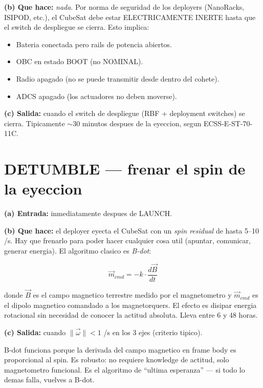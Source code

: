 \documentclass[11pt,a4paper,oneside,openright]{book}
\begin{document}
\textbf{(b) Que hace:} \emph{nada}. Por norma de seguridad de los
deployers (NanoRacks, ISIPOD, etc.), el CubeSat debe estar
ELECTRICAMENTE INERTE hasta que el switch de despliegue se cierra.
Esto implica:

\begin{itemize}[leftmargin=2em]
  \item Bateria conectada pero rails de potencia abiertos.
  \item OBC en estado BOOT (no NOMINAL).
  \item Radio apagado (no se puede transmitir desde dentro del cohete).
  \item ADCS apagado (los actuadores no deben moverse).
\end{itemize}

\textbf{(c) Salida:} cuando el switch de despliegue (RBF + deployment
switches) se cierra. Tipicamente $\sim$30 minutos despues de la
eyeccion, segun ECSS-E-ST-70-11C.

\section{DETUMBLE --- frenar el spin de la eyeccion}

\textbf{(a) Entrada:} inmediatamente despues de LAUNCH.

\textbf{(b) Que hace:} el deployer eyecta el CubeSat con un
\emph{spin residual} de hasta 5--10 \textdegree/s. Hay que frenarlo
para poder hacer cualquier cosa util (apuntar, comunicar, generar
energia). El algoritmo clasico es \emph{B-dot}:

\begin{equation}
\vec{m}_{cmd} = -k \cdot \frac{d\vec{B}}{dt}
\end{equation}

donde $\vec{B}$ es el campo magnetico terrestre medido por el
magnetometro y $\vec{m}_{cmd}$ es el dipolo magnetico comandado a los
magnetorquers. El efecto es disipar energia rotacional sin necesidad
de conocer la actitud absoluta. Lleva entre 6 y 48 horas.

\textbf{(c) Salida:} cuando $\|\vec{\omega}\| < 1$ \textdegree/s en
los 3 ejes (criterio tipico).

\begin{tecnico}
B-dot funciona porque la derivada del campo magnetico en frame body
es proporcional al spin. Es robusto: no requiere knowledge de
actitud, solo magnetometro funcional. Es el algoritmo de
``ultima esperanza'' --- si todo lo demas falla, vuelves a B-dot.
\end{tecnico}
\end{document}
